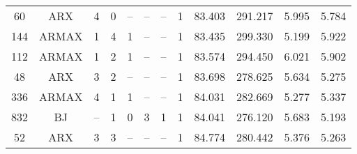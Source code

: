 \begin{tabularx}{\textwidth}{@{} c c *{6}{C} c c c c @{}}
  60   & ARX    & \num{4} & \num{0} &  --     &  --       &  --   & \num{1} & \num{83.403} & \num{291.217} & \num{5.995} & \num{5.784} \\
  144  & ARMAX  & \num{1} & \num{4} & \num{1} &  --       &  --   & \num{1} & \num{83.435} & \num{299.330} & \num{5.199} & \num{5.922} \\
  112  & ARMAX  & \num{1} & \num{2} & \num{1} &  --       &  --   & \num{1} & \num{83.574} & \num{294.450} & \num{6.021} & \num{5.902} \\
  48   & ARX    & \num{3} & \num{2} &  --     &  --       &  --   & \num{1} & \num{83.698} & \num{278.625} & \num{5.634} & \num{5.275} \\
  336  & ARMAX  & \num{4} & \num{1} & \num{1} &  --       &  --   & \num{1} & \num{84.031} & \num{282.669} & \num{5.277} & \num{5.337} \\
  832  & BJ     &  --     & \num{1} & \num{0} & \num{3} & \num{1} & \num{1} & \num{84.041} & \num{276.120} & \num{5.683} & \num{5.193} \\
  52   & ARX    & \num{3} & \num{3} &  --     &  --       &  --   & \num{1} & \num{84.774} & \num{280.442} & \num{5.376} & \num{5.263} \\
  \bottomrule
\end{tabularx}